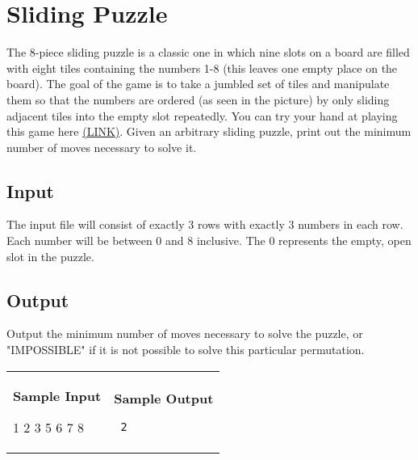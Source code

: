 \documentclass[11pt]{article}
\begin{document}
\section*{Sliding Puzzle}


\begin{wrapfigure}{r}{3in}
\vspace{-10pt}
\vspace{-30pt}
\end{wrapfigure}

The 8-piece sliding puzzle is a classic one in which nine slots on a board are filled with eight tiles containing the numbers 1-8 (this leaves one empty place on the board). The goal of the game is to take a jumbled set of tiles and manipulate them so that the numbers are ordered (as seen in the picture) by only sliding adjacent tiles into the empty slot repeatedly. You can try your hand at playing this game here \href{http://www.tilepuzzles.com/default.asp?p=12}{(LINK)}. Given an arbitrary sliding puzzle, print out the minimum number of moves necessary to solve it.

\subsection*{Input}
The input file will consist of exactly 3 rows with exactly 3 numbers in each row. Each number will be between 0 and 8 inclusive. The 0 represents the empty, open slot in the puzzle.

\subsection*{Output}

Output the minimum number of moves necessary to solve the puzzle, or "IMPOSSIBLE" if it is not possible to solve this particular permutation.

\vspace{0.25in}\hspace{-0.3in}\begin{tabular}{ll}

\parbox{3in}{{\large\bf Sample Input}

\vspace{0.15in}

{\tt 

1 2 3 5 6 7 8
}
}

&

\parbox{3in}{{\large\bf Sample Output}

\vspace{0.15in}

{\tt
2
}
}

\\
\end{tabular}
\end{document}
